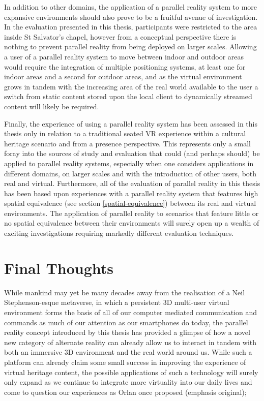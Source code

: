 In addition to other domains, the application of a parallel reality system to more expansive environments should also prove to be a fruitful avenue of investigation. In the evaluation presented in this thesis, participants were restricted to the area inside St Salvator's chapel, however from a conceptual perspective there is nothing to prevent parallel reality from being deployed on larger scales. Allowing a user of a parallel reality system to move between indoor and outdoor areas would require the integration of multiple positioning systems, at least one for indoor areas and a second for outdoor areas, and as the virtual environment grows in tandem with the increasing area of the real world available to the user a switch from static content stored upon the local client to dynamically streamed content will likely be required.

Finally, the experience of using a parallel reality system has been assessed in this thesis only in relation to a traditional seated VR experience within a cultural heritage scenario and from a presence perspective. This represents only a small foray into the sources of study and evaluation that could (and perhaps should) be applied to parallel reality systems, especially when one considers applications in different domains, on larger scales and with the introduction of other users, both real and virtual. Furthermore, all of the evaluation of parallel reality in this thesis has been based upon experiences with a parallel reality system that features high spatial equivalence (see section \ref{spatial-equivalence}) between its real and virtual environments. The application of parallel reality to scenarios that feature little or no spatial equivalence between their environments will surely open up a wealth of exciting investigations requiring markedly different evaluation techniques.


\section{Final Thoughts}

While mankind may yet be many decades away from the realisation of a Neil Stephenson-esque metaverse, in which a persistent 3D multi-user virtual environment forms the basis of all of our computer mediated communication and commands as much of our attention as our smartphones do today, the parallel reality concept introduced by this thesis has provided a glimpse of how a novel new category of alternate reality can already allow us to interact in tandem with both an immersive 3D environment and the real world around us. While such a platform can already claim some small success in improving the experience of virtual heritage content, the possible applications of such a technology will surely only expand as we continue to integrate more virtuality into our daily lives and come to question our experiences as Orlan once proposed (emphasis original);


